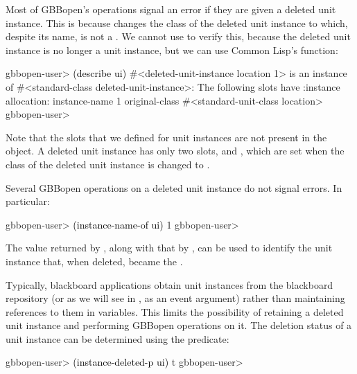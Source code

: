 \documentclass[10pt,twoside,english,pdftex]{article}
\begin{document}
Most of GBBopen's operations signal an error if they are given a deleted unit
instance.  This is because  changes the class
of the deleted unit instance to  which,
despite its name, is not a .  We cannot
use  to verify this, because the deleted unit
instance is no longer a unit instance, but we can use Common Lisp's
 function:
%
\W\supp
\begin{example}
\textcolor{darkergray}{%
  gbbopen-user> \textcolor{black}{(describe ui)}
  #<deleted-unit-instance location 1> is an instance of
    #<standard-class deleted-unit-instance>:
  The following slots have :instance allocation:
    instance-name   1
    original-class  #<standard-unit-class location>
  gbbopen-user>}
\end{example}
%
Note that the slots that we defined for  unit instances
are not present in the  object.  A deleted
unit instance has only two slots,  and
, which are set when the class of the deleted unit
instance is changed to .

Several GBBopen operations on a deleted unit instance do not signal errors.
In particular:
%
\W\supp
\begin{example}
\textcolor{darkergray}{%
  gbbopen-user> \textcolor{black}{(instance-name-of ui)}
  1
  gbbopen-user>}
\end{example}
%
%
%
The value returned by , along with that by
, can be used to identify the unit instance
that, when deleted, became the .

%
%
Typically, blackboard applications obtain unit instances from the blackboard
repository (or as we will see in
,
%
as an event argument) rather than maintaining references to them in variables.
This limits the possibility of retaining a deleted unit instance and
performing GBBopen operations on it.  The deletion status of a unit instance
can be determined using the  predicate:
%
\W\supp
\begin{example}
\textcolor{darkergray}{%
  gbbopen-user> \textcolor{black}{(instance-deleted-p ui)}
  t
  gbbopen-user>}
\end{example}
\end{document}
